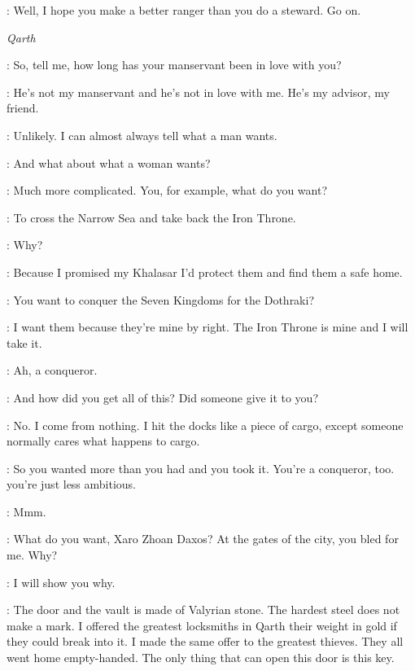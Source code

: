 \JEOR: Well, I hope you make a better ranger than you do a steward. Go on. 



\scene

\textit{Qarth} 


\XARO: So, tell me, how long has your manservant been in love with you? 

\DAENERYS: He's not my manservant and he's not in love with me. He's my advisor, my friend. 

\XARO: Unlikely. I can almost always tell what a man wants. 

\DAENERYS: And what about what a woman wants? 

\XARO: Much more complicated. You, for example, what do you want? 

\DAENERYS: To cross the Narrow Sea and take back the Iron Throne. 

\XARO: Why? 

\DAENERYS: Because I promised my Khalasar I'd protect them and find them a safe home. 

\XARO:  You want to conquer the Seven Kingdoms for the Dothraki? 

\DAENERYS: I want them because they're mine by right. The Iron Throne is mine and I will take it. 

\XARO: Ah, a conqueror. 

\DAENERYS: And how did you get all of this? Did someone give it to you? 

\XARO: No. I come from nothing. I hit the docks like a piece of cargo, except someone normally cares what happens to cargo. 

\DAENERYS: So you wanted more than you had and you took it. You're a conqueror, too. you're just less ambitious. 


\XARO: Mmm. 

\DAENERYS: What do you want, Xaro Zhoan Daxos? At the gates of the city, you bled for me. Why? 

\XARO: I will show you why. 


\XARO: The door and the vault is made of Valyrian stone. The hardest steel does not make a mark. I offered the greatest locksmiths in Qarth their weight in gold if they could break into it. I made the same offer to the greatest thieves. They all went home empty-handed. The only thing that can open this door is this key. 

